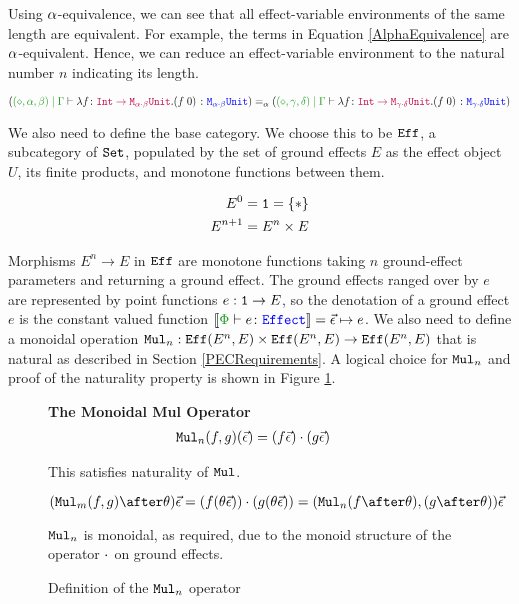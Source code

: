 \documentclass{Report}
\begin{document}
Using $\a$-equivalence, we can see that all effect-variable environments of the same length are equivalent. For example, the terms in Equation \ref{AlphaEquivalence} are $\a$-equivalent. Hence, we can reduce an effect-variable environment to the natural number $n$ indicating its length.

\begin{equation}\label{AlphaEquivalence}
    \scalebox{.8}{$
    (\etyperelation{(\nil, \a, \b)}{\G}{\lam{f}{\fntype{\texttt{Int}}{\M{\a\dot\b}{\U}}}{(\apply{f}{0})}}{\M{\a\dot\b}{\U}})  =_\a(\etyperelation{(\nil, \g, \d)}{\G}{\lam{f}{\fntype{\texttt{Int}}{\M{\g\dot\d}{\U}}}{(\apply{f}{0})}}{\M{\g\dot\d}{\U}})
    $}
\end{equation}


We also need to define the base category. We choose this to be $\Eff$, a subcategory of $\set$, populated by the set of ground effects $E$ as the effect object $U$, its finite products, and monotone functions between them.

\begin{align*}
    E^0 & = \1 = \left\{\singleton\right\}\\
    E^{n+1} &= E^n \times E
\end{align*}

Morphisms $E^n \rightarrow E$ in $\Eff$ are monotone functions taking $n$ ground-effect parameters and returning a ground effect. The ground effects ranged over by $e$ are represented by point functions $e: \1 \rightarrow E$, so the denotation of a ground effect $e$ is the constant valued function $\deno{\typerelation{\P}{e}{\effect}} = \ev \mapsto e$. We also need to define a monoidal operation $\Mul_n: \Eff(E^n, E) \times \Eff(E^n, E) \rightarrow \Eff(E^n, E)$ that is natural as described in Section \ref{PECRequirements}. A logical choice for $\Mul_n$ and proof of the naturality property is shown in Figure \ref{MulDefinition}.

\begin{figure}
    \centering
    \begin{framed}
        \centering\textbf{The Monoidal Mul Operator}
        \begin{align*}
            \Mul_n(f, g)(\ev) & = (f\ev)\dot(g\ev)
        \end{align*}
        
        This satisfies naturality of $\Mul$.
        
        \begin{equation*}
            (\Mul_m(f, g)\after \theta)\ev = (f(\theta\ev))\dot(g(\theta\ev)) = (\Mul_n(f\after\theta), (g\after\theta))\ev
        \end{equation*}

        $\Mul_n$ is monoidal, as required, due to the monoid structure of the operator $\dot$ on ground effects.
    \end{framed}
    
    \caption{Definition of the $\Mul_n$ operator}
    \label{MulDefinition}
\end{figure}
\end{document}
